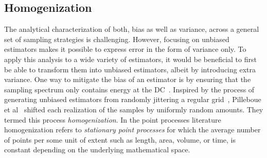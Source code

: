 \documentclass[11pt,fleqn]{book} %
\begin{document}




\subsection{Homogenization}
The analytical characterization of both, bias as well as variance, across a general set of sampling strategies is challenging. 
 However, focusing on unbiased estimators makes it possible to express error in the form of variance only. To apply this analysis to a wide variety of estimators, it would be beneficial to first be able to transform them into unbiased estimators, albeit by introducing extra variance. 
 One way to mitigate the bias of an estimator is by ensuring that the sampling spectrum only contains energy at the DC~\cite{Subr:2013:FAS}. Inspired by the process of generating unbiased estimators from randomly jittering a regular grid~\cite{Ramamoorthi:2012}, Pilleboue et al~\cite{Pilleboue:2015:VAM} shifted each realization of the samples by uniformly random amounts. They termed this process \textit{homogenization}. In the point processes literature homogenization refers to \emph{stationary point processes} for which the average number of points per some unit of extent such as length, area, volume, or time, is constant depending on the underlying mathematical space.
\end{document}
